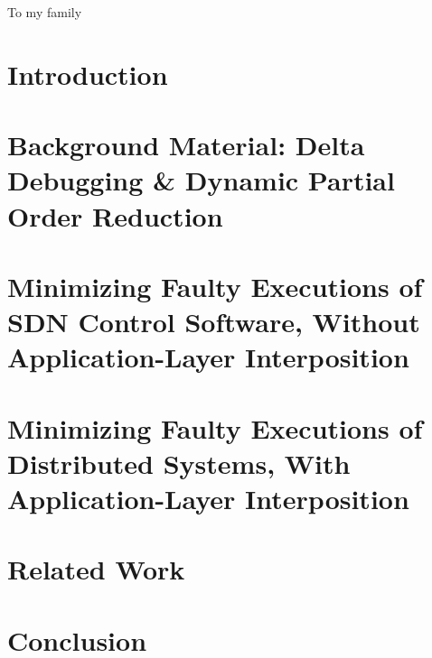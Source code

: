 

\begin{abstract}

\end{abstract}

\begin{frontmatter}

\begin{dedication}
\null\vfil
{\large
\begin{center}
To my family
\end{center}}
\null\vfil
\end{dedication}

\tableofcontents
\listoffigures %
\listoftables %

\makeatletter
\let\@currsize\normalsize
\makeatother
{}
\setlength{\parskip}{.25\baselineskip}%



\end{frontmatter}

\makeatletter
\let\@currsize\normalsize
\makeatother
{}
\setlength{\parskip}{.25\baselineskip}%

\chapter{Introduction}
\label{sec:intro}


\chapter{Background Material: Delta Debugging \& Dynamic Partial Order
Reduction}
\label{sec:background_material}


\chapter{Minimizing Faulty Executions of SDN Control Software, Without Application-Layer Interposition}
\label{sec:sts}


\chapter{Minimizing Faulty Executions of Distributed Systems, With Application-Layer Interposition}
\label{sec:demi}


\chapter{Related Work}
\label{sec:related_work}


\chapter{Conclusion}
\label{main_sec:conclusion}


%

%


\printbibliography


